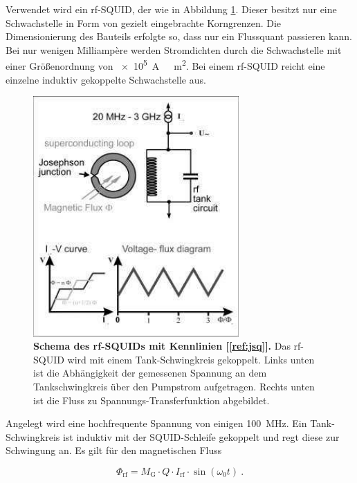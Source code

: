 \documentclass[a4paper,ngerman]{scrartcl}
\begin{document}
Verwendet wird ein rf-SQUID, der wie in Abbildung \ref{fig:jsq}. 
Dieser besitzt nur eine Schwachstelle in Form von gezielt eingebrachte Korngrenzen.
Die Dimensionierung des Bauteils erfolgte so, dass nur ein Flussquant passieren kann.
Bei nur wenigen Milliampère werden Stromdichten durch die Schwachstelle mit einer Größenordnung von \SI{e5}{A \per  \centi \square \meter}.
Bei einem rf-SQUID reicht eine einzelne induktiv gekoppelte Schwachstelle aus.

\begin{figure}[tb!]
\centering
\includegraphics[width=0.7\textwidth]{abbildungen/squid_rf.png}
\caption[Versuchsplatz]{\textbf{Schema des rf-SQUIDs mit Kennlinien [\ref{ref:jsq}].} Das rf-SQUID wird mit einem Tank-Schwingkreis gekoppelt. Links unten ist die Abhängigkeit der gemessenen Spannung an dem Tankschwingkreis über den Pumpstrom aufgetragen. Rechts unten ist die Fluss zu Spannungs-Transferfunktion abgebildet.}
\label{fig:jsq}
\end{figure}



Angelegt wird eine hochfrequente Spannung von einigen \SI{100}{MHz}. 
Ein Tank-Schwingkreis ist induktiv mit der SQUID-Schleife gekoppelt und regt diese zur Schwingung an.
Es gilt für den magnetischen Fluss 

\begin{equation}
\Phi_{\mathrm{rf}} = M_\mathrm{G} \cdot Q \cdot I_{\mathrm{rf}} \cdot \sin(\omega_\mathrm{0} t) ~.
\end{equation}
\end{document}
